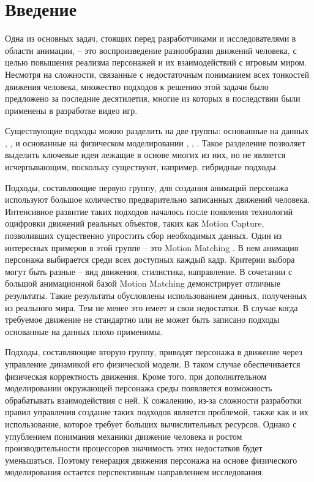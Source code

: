 \section{Введение}

Одна из основных задач, стоящих перед разработчиками и исследователями в области анимации, -- это воспроизведение разнообразия движений человека, с целью повышения реализма персонажей и их взаимодействий с игровым миром. Несмотря на сложности, связанные с недостаточным пониманием всех тонкостей движения человека, множество подходов к решению этой задачи было предложено за последние десятилетия, многие из которых в последствии были применены в разработке видео игр.

Существующие подходы можно разделить на две группы: основанные на данных \cite{ArikanF}, \cite{AkikanFO}, \cite{KovarGP} и основанные на физическом моделировании \cite{AbeSP}, \cite{MacchiettoZS}, \cite{YinLP}. Такое разделение позволяет выделить ключевые идеи лежащие в основе многих из них, но не является исчерпывающим, поскольку существуют, например, гибридные подходы.

Подходы, составляющие первую группу, для создания анимаций персонажа используют большое количество предварительно записанных движений человека. Интенсивное развитие таких подходов началось после появления технологий оцифровки движений реальных объектов, таких как Motion Capture, позволивших существенно упростить сбор необходимых данных. Один из интересных примеров в этой группе -- это Motion Matching \cite{MotionMatching}. В нем анимация персонажа выбирается среди всех доступных каждый кадр. Критерии выбора могут быть разные -- вид движения, стилистика, направление. В сочетании с большой анимационной базой Motion Matching демонстрирует отличные результаты. Такие результаты обусловлены использованием данных, полученных из реального мира. Тем не менее это имеет и свои недостатки. В случае когда требуемое движение не стандартно или не может быть записано подходы основанные на данных плохо применимы.

Подходы, составляющие вторую группу, приводят персонажа в движение через управление динамикой его физической модели. В таком случае обеспечивается физическая корректность движения. Кроме того, при дополнительном моделировании окружающей персонажа среды появляется возможность обрабатывать взаимодействия с ней. К сожалению, из-за сложности разработки правил управления создание таких подходов является проблемой, также как и их использование, которое требует больших вычислительных ресурсов. Однако с углублением понимания механики движение человека и ростом производительности процессоров значимость этих недостатков будет уменьшаться. Поэтому генерация движения персонажа на основе физического моделирования остается перспективным направлением исследования.

